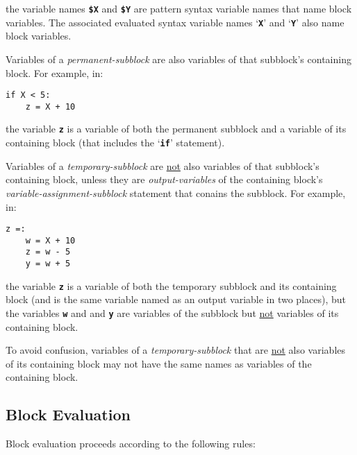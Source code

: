 \documentclass[12pt]{article}
\newcommand{\TT}[1]{{\tt \bfseries #1}}
\newenvironment{indpar}[1][0.3in]%
	{\begin{list}{}%
		     {\setlength{\itemsep}{0in}%
		      \setlength{\topsep}{0in}%
		      \setlength{\parsep}{1ex}%
		      \setlength{\labelwidth}{#1}%
		      \setlength{\leftmargin}{#1}%
		      \addtolength{\leftmargin}{\labelsep}}%
	 \item}%
	{\end{list}}
\begin{document}
the variable names \TT{\$X} and \TT{\$Y} are pattern syntax variable names
that name block variables.  The associated evaluated syntax variable names
`\TT{X}' and `\TT{Y}' also name block variables.

Variables of a {\em permanent-subblock} are also variables of
that subblock's containing block.  For example, in:
\begin{indpar}[1in]\begin{verbatim}
if X < 5:
    z = X + 10
\end{verbatim}\end{indpar}
the variable \TT{z} is a variable of both the permanent subblock and
a variable of its containing block (that includes the `\TT{if}' statement).

Variables of a {\em temporary-subblock} are \underline{not}
also variables of that subblock's containing block, unless they
are {\em output-variables} of the containing block's
{\em variable-assignment-subblock} statement that conains the
subblock.  For example, in:
\begin{indpar}[1in]\begin{verbatim}
z =:
    w = X + 10
    z = w - 5
    y = w + 5
\end{verbatim}\end{indpar}
the variable \TT{z} is a variable of both the temporary subblock
and its containing block (and is the same variable named as an
output variable in two places), but the variables \TT{w} and 
and \TT{y} are variables of the subblock but \underline{not}
variables of its containing block.

To avoid confusion, variables of a {\em temporary-subblock}
that are \underline{not} also variables of its containing
block may not have the same names as variables of the containing block.

\subsection{Block Evaluation}
\label{BLOCK-EVALUATION}

Block evaluation proceeds according to the following rules:
\end{document}
